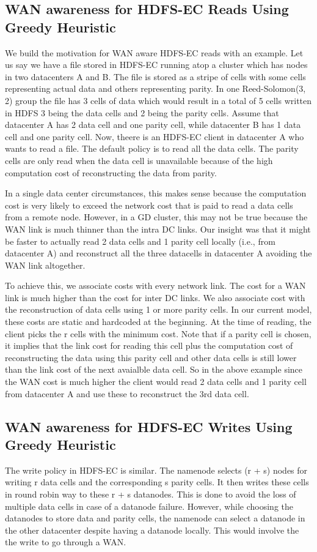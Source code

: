 \documentclass{sig-alternate-05-2015}
\begin{document}
\subsection{WAN awareness for HDFS-EC Reads Using Greedy Heuristic}
We build the motivation for WAN aware HDFS-EC reads with an example. Let us say we have a file stored in HDFS-EC running atop a cluster which has nodes in two datacenters A and B. The file is stored as a stripe of cells with some cells representing actual data and others representing parity. In one Reed-Solomon(3, 2) group the file has 3 cells of data which would result in a total of 5 cells written in HDFS 3 being the data cells and 2 being the parity cells. Assume that datacenter A has 2 data cell and one parity cell, while datacenter B has 1 data cell and one parity cell. Now, theere is an HDFS-EC client in datacenter A who wants to read a file.  The default policy is to read all the data cells. The parity cells are only read when the data cell is unavailable because of the high computation cost of reconstructing the data from parity.

In a single data center circumstances, this makes sense because the computation cost is very likely to exceed the network cost that is paid to read a data cells from a remote node.  However, in a GD cluster, this may not be true because the WAN link is much thinner than the intra DC links. Our insight was that it might be faster to actually read 2 data cells and 1 parity cell locally (i.e., from datacenter A) and reconstruct all the three datacells in datacenter A avoiding the WAN link altogether.

To achieve this, we associate costs with every network link. The cost for a WAN link is much higher than the cost for inter DC links. We also associate cost with the reconstruction of data cells using 1 or more parity cells. In our current model, these costs are static and hardcoded at the beginning. At the time of reading, the client picks the r cells with the minimum cost. Note that if a parity cell is chosen, it implies that the link cost for reading this cell plus the computation cost of reconstructing the data using this parity cell and other data cells is still lower than the link cost of the next avaialble data cell. So in the above example since the WAN cost is much higher the client would read 2 data cells and 1 parity cell from datacenter A and use these to reconstruct the 3rd data cell.

\subsection{WAN awareness for HDFS-EC Writes Using Greedy Heuristic}
The write policy in HDFS-EC is similar. The namenode selects (r + s) nodes for writing r data cells and the corresponding s parity cells. It then writes these cells in round robin way to these r + s datanodes. This is done to avoid the loss of multiple data cells in case of a datanode failure. However, while choosing the datanodes to store data and parity cells, the namenode can select a datanode in the other datacenter despite having a datanode locally. This would involve the the write to go through a WAN. 
\end{document}
